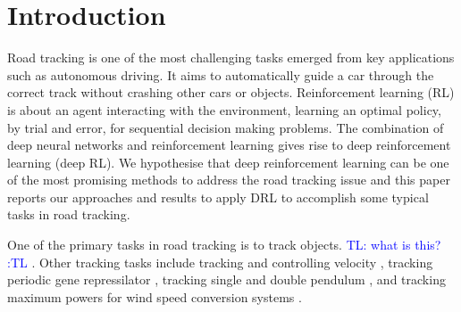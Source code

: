 \documentclass{svproc}
\newcommand{\tl}[1]{\textcolor{blue} {TL: #1 :TL} }
\begin{document}
\section{Introduction}

Road tracking is one of the most challenging tasks emerged from key applications such as autonomous driving. It aims to automatically guide a car through the correct track without crashing other cars or objects.  
Reinforcement learning (RL) is about an agent interacting with the environment, learning an optimal policy, by trial and error, for sequential decision making problems.
%
The combination of deep neural networks and reinforcement learning gives rise to deep
reinforcement learning (deep RL). We hypothesise that deep reinforcement learning %
can be one of the most promising %
methods %
to address 
the road tracking issue and this paper %
reports our approaches and results to apply DRL to accomplish some typical tasks in road tracking. 


One of the primary tasks in road tracking is to track objects. \tl{what is this?} \cite{Grigore2000Reinforcement,Cohen2010Reinforcement,Liu2004Reinforcement,Supancic2017Tracking}. %
Other tracking tasks include tracking and controlling velocity \cite{Jinlin2009Neurofuzzy}, tracking periodic gene repressilator \cite{Sootla2013On}, tracking single and double pendulum \cite{Hall2011Reinforcement}, and tracking maximum powers for wind speed conversion systems \cite{Wei2015Reinforcement}. 
\end{document}
